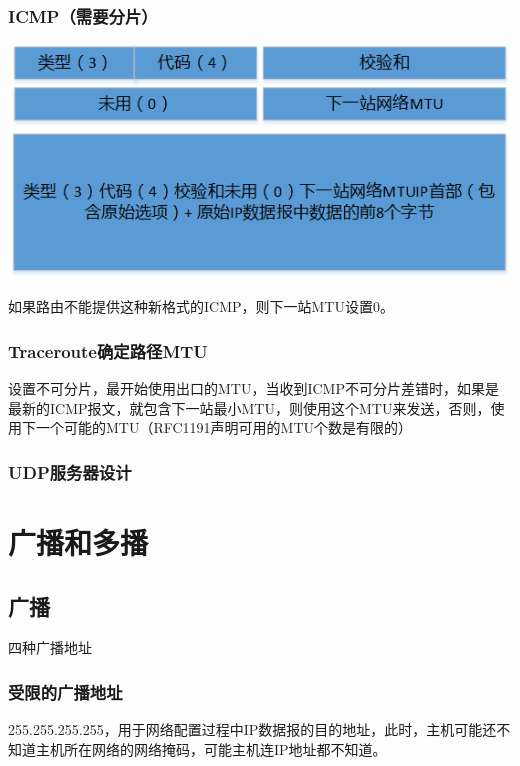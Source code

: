 \subsubsection{ICMP（需要分片）}

\includegraphics[scale=1]{protocol/resources/ICMP-header.png}

如果路由不能提供这种新格式的ICMP，则下一站MTU设置0。

\subsubsection{Traceroute确定路径MTU}

设置不可分片，最开始使用出口的MTU，当收到ICMP不可分片差错时，如果是最新的ICMP报文，就包含下一站最小MTU，则使用这个MTU来发送，否则，使用下一个可能的MTU（RFC1191声明可用的MTU个数是有限的）

\subsubsection{UDP服务器设计}



\section{广播和多播}

\subsection{广播}

四种广播地址

\subsubsection{受限的广播地址}

255.255.255.255，用于网络配置过程中IP数据报的目的地址，此时，主机可能还不知道主机所在网络的网络掩码，可能主机连IP地址都不知道。

